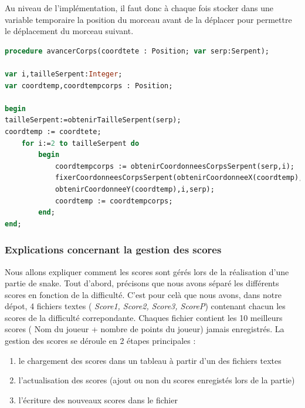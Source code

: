\documentclass[11pt,a4paper]{article}
\begin{document}
        Au niveau de l’implémentation, il faut donc à chaque fois stocker dans une variable temporaire la position du morceau avant de la déplacer pour permettre le déplacement du morceau suivant. \\
        
        \begin{lstlisting}[language=Pascal,frame=single,caption=Code source de la procédure avancerCorps]
procedure avancerCorps(coordtete : Position; var serp:Serpent);

var i,tailleSerpent:Integer;
var coordtemp,coordtempcorps : Position;

begin
tailleSerpent:=obtenirTailleSerpent(serp);
coordtemp := coordtete;
    for i:=2 to tailleSerpent do 
        begin
            coordtempcorps := obtenirCoordonneesCorpsSerpent(serp,i);
            fixerCoordonneesCorpsSerpent(obtenirCoordonneeX(coordtemp),
            obtenirCoordonneeY(coordtemp),i,serp);
            coordtemp := coordtempcorps;
        end;
end;
        \end{lstlisting}
        
        \subsubsection{Explications concernant la gestion des scores}
        
        Nous allons expliquer comment les scores sont gérés lors de la réalisation d'une partie de snake.
        Tout d'abord, précisons que nous avons séparé les différents scores en fonction de la difficulté. 
        C'est pour celà que nous avons, dans notre dépot, 4 fichiers textes (\textit{ Score1, Score2, Score3, ScoreP}) contenant chacun les scores de la difficulté correpondante. Chaques fichier contient les 10 meilleurs scores ( Nom du joueur + nombre de points du joueur) jamais enregistrés.
        La gestion des scores se déroule en 2 étapes principales :
        
        \begin{enumerate}
         \item le chargement des scores dans un tableau à partir d'un des fichiers textes
         \item l'actualisation des scores (ajout ou non du scores enregistés lors de la partie)
         \item l'écriture des nouveaux scores dans le fichier
         
        \end{enumerate}
        
\end{document}
